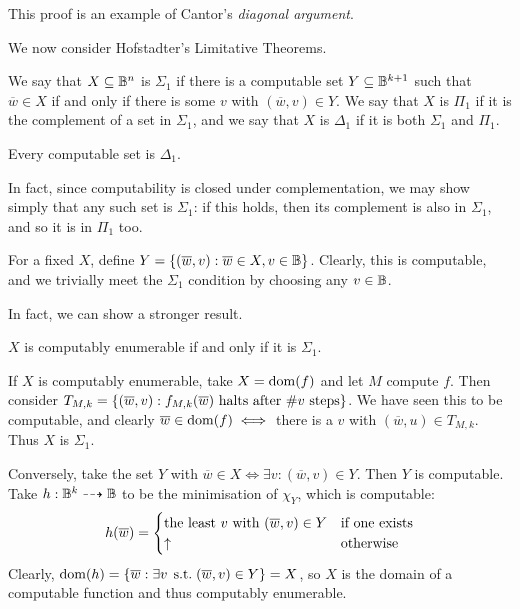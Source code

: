 \documentclass{article}
\begin{document}
\begin{note}
	This proof is an example of Cantor's \textit{diagonal argument}.
\end{note}

We now consider Hofstadter's Limitative Theorems.

\begin{definition}
	We say that $X \subseteq \mathbb{B}^n$ is $\Sigma_1$ if there is a computable set $Y \subseteq \mathbb{B}^{k+1}$ such that $\overline w \in X$ if and only if there is some $v$ with $(\overline w, v) \in Y$. We say that $X$ is $\Pi_1$ if it is the complement of a set in $\Sigma_1$, and we say that $X$ is $\Delta_1$ if it is both $\Sigma_1$ and $\Pi_1$.
\end{definition}

\begin{proposition}
	Every computable set is $\Delta_1$.
\end{proposition}

\begin{prf}
	In fact, since computability is closed under complementation, we may show simply that any such set is $\Sigma_1$: if this holds, then its complement is also in $\Sigma_1$, and so it is in $\Pi_1$ too.
	    
	For a fixed $X$, define $Y = \left\lbrace (\overline w, v): \overline w \in X, v \in \mathbb{B} \right\rbrace$. Clearly, this is computable, and we trivially meet the $\Sigma_1$ condition by choosing any $v \in \mathbb{B}$.
\end{prf}

In fact, we can show a stronger result.

\begin{theorem}
	$X$ is computably enumerable if and only if it is $\Sigma_1$.
\end{theorem}

\begin{prf}
	If $X$ is computably enumerable, take $X = \operatorname{dom}(f)$ and let $M$ compute $f$. Then consider $T_{M,k} = \left\lbrace (\overline w, v) : f_{M,k}(\overline w) \text{ halts after } \# v \text{ steps} \right\rbrace$. We have seen this to be computable, and clearly $\overline w \in \operatorname{dom}(f) \iff $ there is a $v$ with $(\overline w, u) \in T_{M,k}$. Thus $X$ is $\Sigma_1$.
	    
	Conversely, take the set $Y$ with $\overline w \in X \iff \exists v: (\overline w, v) \in Y$. Then $Y$ is computable. Take $h: \mathbb{B}^k \dashrightarrow \mathbb{B}$ to be the minimisation of $\chi_Y$, which is computable:
	\[
		h(\overline w) = \begin{cases}
		\text{the least $v$ with $(\overline w, v) \in Y$} & \text{if one exists} \\
		\uparrow & \!\mathrel{\, \text{otherwise}}
		\end{cases}
	\]
	Clearly, $\operatorname{dom}(h) = \left\lbrace \overline w: \exists v \mathrel{\, \text{s.t.}} (\overline w, v) \in Y \right\rbrace = X$, so $X$ is the domain of a computable function and thus computably enumerable.
\end{prf}
\end{document}
